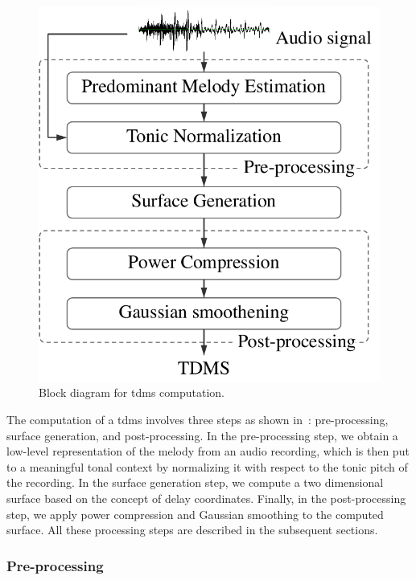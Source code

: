 \begin{figure}
	\begin{center}
		\includegraphics[width=\figSizeFifty]{ch07_ragaRecognition/figures/tdms_computation.pdf}
	\end{center}
	\caption{Block diagram for \gls{tdms} computation.}
	\label{fig:bd_tdms_computation}
\end{figure}

The computation of a \gls{tdms} involves three steps as shown in~: pre-processing, surface generation, and post-processing. In the pre-processing step, we obtain a low-level representation of the melody from an audio recording, which is then put to a meaningful tonal context by normalizing it with respect to the tonic pitch of the recording. In the surface generation step, we compute a two dimensional surface based on the concept of delay coordinates. Finally, in the post-processing step, we apply power compression and Gaussian smoothing to the computed surface. All these processing steps are described in the subsequent sections.

\subsubsection{Pre-processing} 
\label{sec:tdms_preprocessing}

